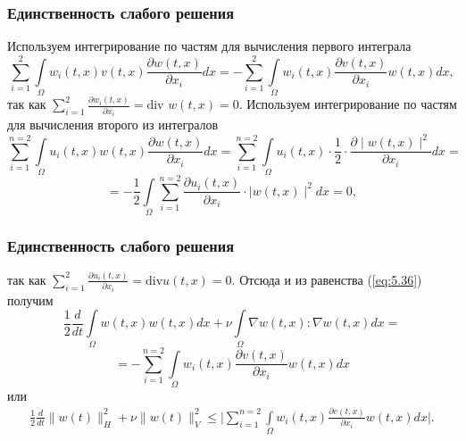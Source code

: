 \documentclass[10pt, pdf, hyperref={unicode}]{beamer}
\begin{document}
    \begin{frame}
    \frametitle{Единственность слабого решения}
    \begin{center}
      \begin{minipage}[h]{0.97\linewidth}
      Используем интегрирование по частям для вычисления первого интеграла
      $$\sum_{i=1}^{2}\int\limits_\Omega w_i(t, x)v(t, x)\frac{\partial w(t, x)}{\partial x_i}dx=
      -\sum_{i=1}^{2}\int\limits_\Omega w_i(t, x)\frac{\partial v(t, x)}{\partial x_i}w(t, x)dx,$$
      так как $\sum\limits_{i=1}^{2}\frac{\partial w_i(t, x)}{\partial x_i} = \textrm{div } w(t, x)=0$. Используем интегрирование по частям для вычисления второго из интегралов
      $$\sum_{i=1}^{n=2}\int\limits_\Omega u_i(t,x)w(t, x)\frac{\partial w(t, x)}{\partial x_i}dx=
      \sum_{i=1}^{n=2}\int\limits_\Omega u_i(t,x)\cdot\frac{1}{2}\cdot\frac{\partial \mid w(t, x)\mid^2}{\partial x_i}dx=$$
      $$=-\frac{1}{2}\int\limits_\Omega\sum_{i=1}^{n=2}\frac{\partial u_i(t, x)}{\partial x_i}\cdot\mid w(t, x)\mid^2dx=0,$$
      \end{minipage}
    \end{center}
  \end{frame}

    \begin{frame}
    \frametitle{Единственность слабого решения}
    \begin{center}
      \begin{minipage}[h]{0.97\linewidth}
      так как $\sum\limits_{i=1}^{2}\frac{\partial u_i(t, x)}{\partial x_i} = \textrm{div} u(t, x)=0.$
    Отсюда и из равенства (\ref{eq:5.36}) получим
    $$\frac{1}{2}\frac{d}{dt}\int\limits_\Omega w(t, x)w(t, x)dx+\nu\int\limits_{\Omega}\nabla w(t,x):\nabla w(t,x)dx=$$
    $$=-\sum_{i=1}^{n=2}\int\limits_\Omega w_i(t, x)\frac{\partial v(t, x)}{\partial x_i}w(t, x)dx$$
    или
    \begin{equation}\label{eq:5.37}
        \begin{gathered}
            \frac{1}{2}\frac{d}{dt}\| w(t)\|_H^2+\nu\| w(t)\|_V^2\le
            \bigg|\sum_{i=1}^{n=2}\int\limits_\Omega w_i(t, x)\frac{\partial v(t, x)}{\partial x_i}w(t, x)dx\bigg|.
        \end{gathered}
    \end{equation}
      \end{minipage}
    \end{center}
  \end{frame}
\end{document}
